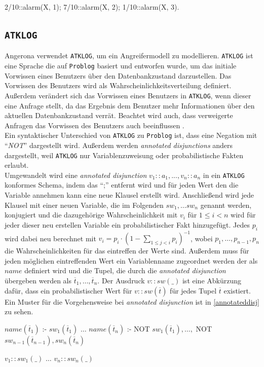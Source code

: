 \documentclass[german,version-2020-11]{uzl-thesis}
\begin{document}
\begin{Pseudocode}[caption={\texttt{Problog}-Beispiel \textit{annotated disjunction}}, label={code:annotateddisjunction}, numbers=left]
2/10::alarm(X, 1); 7/10::alarm(X, 2); 1/10::alarm(X, 3).
\end{Pseudocode}

\subsection{\texttt{ATKLOG}} \label{sub:atklog}
Angerona verwendet \texttt{ATKLOG}, um ein Angreifermodell zu modellieren. \texttt{ATKLOG} ist eine Sprache die auf \texttt{Problog} basiert und entworfen wurde, um das initiale Vorwissen eines Benutzers über den Datenbankzustand darzustellen. Das Vorwissen des Benutzers wird als Wahrscheinlichkeitsverteilung definiert. Außerdem verändert sich das Vorwissen eines Benutzers in \texttt{ATKLOG}, wenn dieser eine Anfrage stellt, da das Ergebnis dem Benutzer mehr Informationen über den aktuellen Datenbankzustand verrät. Beachtet wird auch, dass verweigerte Anfragen das Vorwissen des Benutzers auch beeinflussen \cite{guarnieri2017securing}. \\ 
Ein syntaktischer Unterschied von \texttt{ATKLOG} zu \texttt{Problog} ist, dass eine Negation mit \enquote{\textit{NOT}} dargestellt wird. Außerdem werden \textit{annotated disjunctions} anders dargestellt, weil \texttt{ATKLOG} nur Variablenzuweisung oder probabilistische Fakten erlaubt. \\ Umgewandelt wird eine \textit{annotated disjunction} $v_1::a_1, ..., v_n::a_n$ in ein \texttt{ATKLOG} konformes Schema, indem das \enquote{;} entfernt wird und für jeden Wert den die Variable annehmen kann eine neue Klausel erstellt wird. Anschließend wird jede Klausel mit einer neuen Variable, die im Folgenden $sw_1, \dots sw_n$ genannt werden, konjugiert und die dazugehörige Wahrscheinlichkeit mit $v_i$ für $1 \leq i < n$ wird für jeder dieser neu erstellen Variable ein probabilistischer Fakt hinzugefügt. Jedes $p_i$ wird dabei neu berechnet mit $v_i = p_i \cdot (1 - \sum_{1\leq j<i}p_i)^{-1}$, wobei $p_1, \dots ,p_{n-1}, p_n$ die Wahrscheinlichkeiten für das eintreffen der Werte sind.
Außerdem muss für jeden möglichen eintreffenden Wert ein Variablenname zugeordnet werden der als $name$ definiert wird und die Tupel, die durch die \textit{annotated disjunction} übergeben werden als $\overline{t}_1 , \dots , \overline{t}_n$. Der Ausdruck $v::sw(\_)$ ist eine Abkürzung dafür, dass ein probabilistischer Wert für $v::sw(\overline{t})$ für jedes Tupel $\overline{t}$ existiert. Ein Muster für die Vorgehensweise bei \textit{annotated disjunction} ist in \autoref{annotateddisj} zu sehen.
\begin{Pseudocode}[caption={Vorgehensweise bei \textit{annotated disjunction}}, label={annotateddisj}, numbers=left]
$name(\overline{t}_1)$ :- $sw_1(\overline{t}_1)$
$\dots$
$name(\overline{t}_n)$ :- NOT $sw_1(\overline{t}_1), \dots ,$ NOT $sw_{n−1}(\overline{t}_{n−1}), sw_n(\overline{t}_n)$
	
$v_1::sw_1(\_)$
$\dots$
$v_n::sw_n(\_)$
\end{Pseudocode} 
\end{document}
